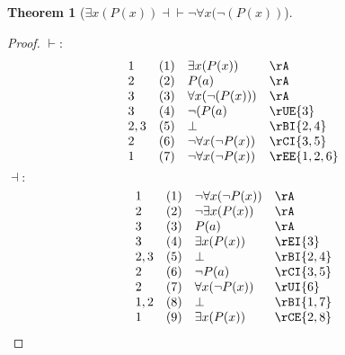 \documentclass{book}
\theoremstyle{plain}
\newtheorem{theorem}{Theorem}
\theoremstyle{remark}
\theoremstyle{definition}
\begin{document}
\label{ExxLpPLpxRpRpEqvnFaxLpnLpPLpxRpRp}
\begin{theorem}[\(\exists x(P(x)) \dashv\vdash \neg\forall x (\neg(P(x))\)]	
\end{theorem}
\begin{proof}
	\(\vdash:\)
	\[
	\begin{array}{llll}
		1 & (1) & \exists x(P(x)) & \rA \\
		2 & (2) & P(a) & \rA \\
		3 & (3) & \forall x (\neg(P(x))) & \rA \\
		3 & (4) & \neg(P(a) & \rUE{3} \\
		2,3 & (5) & \bot & \rBI{2,4} \\
		2 & (6) & \neg\forall x(\neg P(x)) & \rCI{3,5} \\
		1 & (7) & \neg\forall x(\neg P(x)) & \rEE{1,2,6} \\
	\end{array}
	\]
	\(\dashv:\)
	\[
	\begin{array}{llll}
		1 & (1) & \neg\forall x(\neg P(x)) & \rA \\
		2 & (2) & \neg\exists x(P(x)) & \rA \\
		3 & (3) & P(a) & \rA \\
		3 & (4) & \exists x(P(x)) & \rEI{3} \\
		2,3 & (5) & \bot & \rBI{2,4} \\
		2 & (6) & \neg P(a) & \rCI{3,5} \\
		2 & (7) & \forall x(\neg P(x)) & \rUI{6} \\
		1,2 & (8) & \bot & \rBI{1,7} \\
		1 & (9) & \exists x(P(x)) & \rCE{2,8} \\
	\end{array}
	\]
\end{proof}
\end{document}
